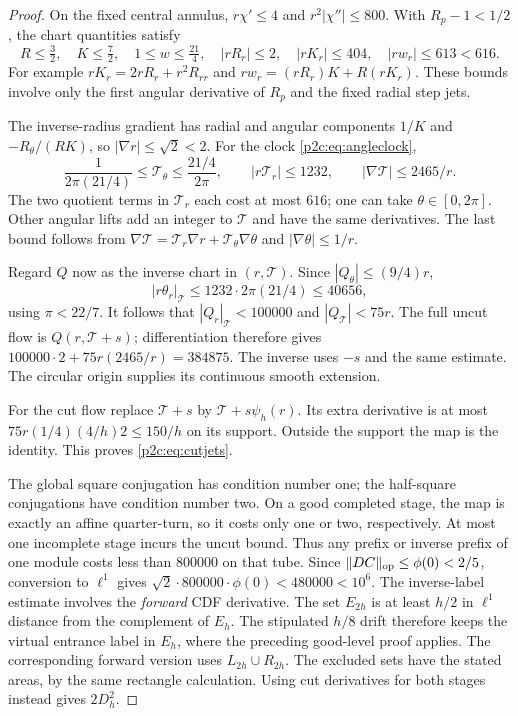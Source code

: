 \documentclass[11pt]{article}
\numberwithin{equation}{section}
\theoremstyle{definition}
\theoremstyle{remark}
\begin{document}
\begin{proof}
On the fixed central annulus,
$r\chi'\leq4$ and $r^2|\chi''|\leq800$. With $R_p-1<1/2$,
the chart quantities satisfy
\[
 R\leq\tfrac32,\quad K\leq\tfrac72,\quad
 1\leq w\leq\tfrac{21}4,\quad
 |rR_r|\leq2,\quad |rK_r|\leq404,\quad
 |rw_r|\leq613<616 .
\]
For example $rK_r=2rR_r+r^2R_{rr}$ and
$rw_r=(rR_r)K+R(rK_r)$. These bounds involve only the first
angular derivative of $R_p$ and the fixed radial step jets.

The inverse-radius gradient has radial and angular components
$1/K$ and $-R_\theta/(RK)$, so $|\nabla r|\leq\sqrt2<2$.
For the clock \eqref{p2c:eq:angleclock},
\[
 \frac1{2\pi(21/4)}\leq\mathcal T_\theta
          \leq\frac{21/4}{2\pi},\qquad
 |r\mathcal T_r|\leq1232,\qquad
 |\nabla\mathcal T|\leq2465/r .
\]
The two quotient terms in $\mathcal T_r$ each cost at most
$616$; one can take $\theta\in[0,2\pi]$. Other angular lifts
add an integer to $\mathcal T$ and have the same derivatives.
The last bound follows from
$\nabla\mathcal T=\mathcal T_r\nabla r+
\mathcal T_\theta\nabla\theta$ and $|\nabla\theta|\leq1/r$.

Regard $Q$ now as the inverse chart in $(r,\mathcal T)$.
Since $|Q_\theta|\leq(9/4)r$,
\[
 |r\theta_r|_{\mathcal T}\leq1232\cdot2\pi(21/4)
                         \leq40656 ,
\]
using $\pi<22/7$. It follows that
$|Q_r|_{\mathcal T}<100000$ and $|Q_{\mathcal T}|<75r$.
The full uncut flow is $Q(r,\mathcal T+s)$; differentiation
therefore gives
$100000\cdot2+75r(2465/r)=384875$.
The inverse uses $-s$ and the same estimate. The circular
origin supplies its continuous smooth extension.

For the cut flow replace $\mathcal T+s$ by
$\mathcal T+s\psi_h(r)$. Its extra derivative is at most
$75r(1/4)(4/h)2\leq150/h$ on its support. Outside the
support the map is the identity. This proves
\eqref{p2c:eq:cutjets}.

The global square conjugation has condition number one;
the half-square conjugations have condition number two.
On a good completed stage, the map is exactly an affine
quarter-turn, so it costs only one or two, respectively.
At most one incomplete stage incurs the uncut bound.
Thus any prefix or inverse prefix of one module costs
less than $800000$ on that tube. Since
$\|DC\|_{\rm op}\leq\phi(0)<2/5$, conversion to
$\ell^1$ gives
$\sqrt2\cdot800000\cdot\phi(0)<480000<10^6$.
The inverse-label estimate involves the \emph{forward} CDF
derivative. The set $E_{2h}$ is at least $h/2$ in
$\ell^1$ distance from the complement of $E_h$.
The stipulated $h/8$ drift therefore keeps the virtual
entrance label in $E_h$, where the preceding good-level
proof applies. The corresponding forward version uses
$L_{2h}\cup R_{2h}$. The excluded sets have the stated
areas, by the same rectangle calculation. Using cut
derivatives for both stages instead gives $2D_h^2$.


\end{proof}
\end{document}
